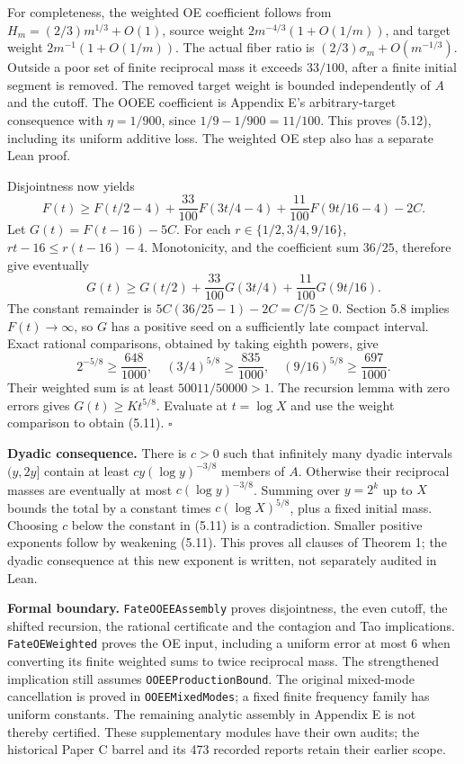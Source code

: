 \documentclass[11pt,a4paper]{article}
\begin{document}
For completeness, the weighted OE coefficient follows from
\(H_m=(2/3)m^{1/3}+O(1)\), source weight \(2m^{-4/3}(1+O(1/m))\), and
target weight \(2m^{-1}(1+O(1/m))\). The actual fiber ratio is
\((2/3)\sigma_m+O(m^{-1/3})\). Outside a poor set of finite reciprocal
mass it exceeds \(33/100\), after a finite initial segment is removed.
The removed target weight is bounded independently of \(A\) and the
cutoff. The OOEE coefficient is Appendix E's arbitrary-target
consequence with \(\eta=1/900\), since \(1/9-1/900=11/100\). This proves
(5.12), including its uniform additive loss. The weighted OE step also
has a separate Lean proof.

Disjointness now yields \[
F(t)\ge F(t/2-4)+\frac{33}{100}F(3t/4-4)
                  +\frac{11}{100}F(9t/16-4)-2C.
\] Let \(G(t)=F(t-16)-5C\). For each \(r\in\{1/2,3/4,9/16\}\),
\(rt-16\le r(t-16)-4\). Monotonicity, and the coefficient sum \(36/25\),
therefore give eventually \[
G(t)\ge G(t/2)+\frac{33}{100}G(3t/4)
                  +\frac{11}{100}G(9t/16).
\tag{5.13}
\] The constant remainder is \(5C(36/25-1)-2C=C/5\ge0\). Section 5.8
implies \(F(t)\to\infty\), so \(G\) has a positive seed on a
sufficiently late compact interval. Exact rational comparisons, obtained
by taking eighth powers, give \[
2^{-5/8}\ge\frac{648}{1000},\quad
(3/4)^{5/8}\ge\frac{835}{1000},\quad
(9/16)^{5/8}\ge\frac{697}{1000}.
\] Their weighted sum is at least \(50011/50000>1\). The recursion lemma
with zero errors gives \(G(t)\ge Kt^{5/8}\). Evaluate at \(t=\log X\)
and use the weight comparison to obtain (5.11). \(\square\)

\textbf{Dyadic consequence.} There is \(c>0\) such that infinitely many
dyadic intervals \((y,2y]\) contain at least \(cy(\log y)^{-3/8}\)
members of \(A\). Otherwise their reciprocal masses are eventually at
most \(c(\log y)^{-3/8}\). Summing over \(y=2^k\) up to \(X\) bounds the
total by a constant times \(c(\log X)^{5/8}\), plus a fixed initial
mass. Choosing \(c\) below the constant in (5.11) is a contradiction.
Smaller positive exponents follow by weakening (5.11). This proves all
clauses of Theorem 1; the dyadic consequence at this new exponent is
written, not separately audited in Lean.

\textbf{Formal boundary.} \texttt{\nolinkurl{FateOOEEAssembly}} proves
disjointness, the even cutoff, the shifted recursion, the rational
certificate and the contagion and Tao implications.
\texttt{\nolinkurl{FateOEWeighted}} proves the OE input, including a
uniform error at most 6 when converting its finite weighted sums to
twice reciprocal mass. The strengthened implication still assumes
\texttt{\nolinkurl{OOEEProductionBound}}. The original mixed-mode
cancellation is proved in \texttt{\nolinkurl{OOEEMixedModes}}; a fixed
finite frequency family has uniform constants. The remaining analytic
assembly in Appendix E is not thereby certified. These supplementary
modules have their own audits; the historical Paper C barrel and its 473
recorded reports retain their earlier scope.
\end{document}
